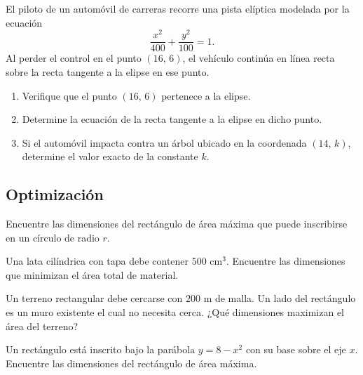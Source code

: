 \begin{prob}
El piloto de un automóvil de carreras recorre una pista elíptica modelada
por la ecuación
\[
    \frac{x^2}{400} + \frac{y^2}{100} = 1.
\]
Al perder el control en el punto $(16,\,6)$, el vehículo continúa en línea
recta sobre la recta tangente a la elipse en ese punto.
\begin{enumerate}
    \item Verifique que el punto $(16,\,6)$ pertenece a la elipse.
    \item Determine la ecuación de la recta tangente a la elipse en dicho
          punto.
    \item Si el automóvil impacta contra un árbol ubicado en la coordenada
          $(14,\, k)$, determine el valor exacto de la constante $k$.
\end{enumerate}
\end{prob}

\subsection{Optimización}

\begin{prob}
Encuentre las dimensiones del rectángulo de área máxima que puede
inscribirse en un círculo de radio $r$.
\end{prob}

\begin{prob}
Una lata cilíndrica con tapa debe contener $500$ cm$^3$. Encuentre
las dimensiones que minimizan el área total de material.
\end{prob}

\begin{prob}
Un terreno rectangular debe cercarse con $200$ m de malla. Un lado
del rectángulo es un muro existente el cual no necesita cerca. ¿Qué
dimensiones maximizan el área del terreno?
\end{prob}

\begin{prob}
Un rectángulo está inscrito bajo la parábola $y=8-x^2$ con su base
sobre el eje $x$. Encuentre las dimensiones del rectángulo de área
máxima.
\end{prob}

